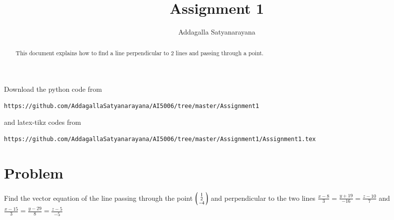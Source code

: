 \documentclass[journal,12pt,twocolumn]{IEEEtran}
\begin{document}
\renewcommand{\thefigure}{\theproblem}
\def\putbox#1#2#3{\makebox[0in][l]{\makebox[#1][l]{}\raisebox{\baselineskip}[0in][0in]{\raisebox{#2}[0in][0in]{#3}}}}
     \def\rightbox#1{\makebox[0in][r]{#1}}
     \def\centbox#1{\makebox[0in]{#1}}
     \def\topbox#1{\raisebox{-\baselineskip}[0in][0in]{#1}}
     \def\midbox#1{\raisebox{-0.5\baselineskip}[0in][0in]{#1}}
\vspace{3cm}
\title{Assignment 1}
\author{Addagalla Satyanarayana}
\maketitle
\newpage
\bigskip
\renewcommand{\thefigure}{\theenumi}
\renewcommand{\thetable}{\theenumi}
\begin{abstract}
This document explains how to find a line perpendicular to 2 lines and passing through a point.
\end{abstract}
Download the python code from 
%
\begin{lstlisting}
https://github.com/AddagallaSatyanarayana/AI5006/tree/master/Assignment1
\end{lstlisting}
%
and latex-tikz codes from 
%
\begin{lstlisting}
https://github.com/AddagallaSatyanarayana/AI5006/tree/master/Assignment1/Assignment1.tex
\end{lstlisting}
%
\section{Problem}

Find the vector equation of the line passing through the point $\begin{psmallmatrix}1 \\2 \\-4	\end{psmallmatrix}$
and perpendicular to the two lines
   	$\frac{x-8}{3} = \frac{y+19}{-16}= \frac{z-10}{7}$  and
	$\frac{x-15}{3} = \frac{y-29}{8}= \frac{z-5}{-5}$
\end{document}
